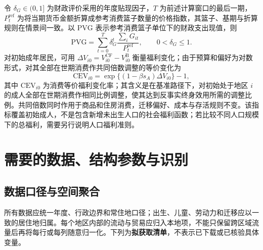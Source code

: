 \documentclass[UTF8,a4paper,zihao=-4,fontset=windows]{ctexart}
\numberwithin{equation}{section}
\newcommand{\B}{\mathrm B}
\newcommand{\CF}{\mathrm{CF}}
\begin{document}
令 $\delta_G\in(0,1]$ 为财政评价采用的年度贴现因子，$T$ 为前述计算窗口的最后一期，$P_t^{\mathrm{ref}}$ 为将当期货币金额折算成参考消费篮子数量的价格指数，其篮子、基期与折算规则在情景间一致。以 $\mathrm{PVG}$ 表示参考消费篮子单位下的财政支出现值，则
\begin{equation}
  \mathrm{PVG}=\sum_{t=0}^{T}\delta_G^t
      \frac{\sum_iG_{it}}{P^{\mathrm{ref}}_t},
  \qquad 0<\delta_G\leq1.
  \label{eq:fiscal-present-value}
\end{equation}
对初始成年居民，可用
$\Delta V_{i0}=V^{\CF}_{i0}-V^\B_{i0}$ 衡量福利变化；由于预算和偏好为对数形式，对其全部在世期消费作共同倍数调整的等价变化为
\begin{equation}
  \mathrm{CEV}_{i0}=\exp\{(1-\beta s_A)\Delta V_{i0}\}-1,
  \label{eq:welfare-cev}
\end{equation}
其中 $\mathrm{CEV}_{i0}$ 为消费等价福利变化率；其含义是在基准路径下，对初始处于地区 $i$ 的成人全部在世期消费作相同比例调整，使其达到反事实终身效用所需的调整比例。共同倍数同时作用于商品和住房消费，迁移偏好、成本与存活规则不变。该指标覆盖初始成人，不是包含新增未出生人口的社会福利函数；若比较不同人口规模下的总福利，需要另行说明人口福利准则。

\section{需要的数据、结构参数与识别}
\label{sec:data-parameters}

\subsection{数据口径与空间聚合}
所有数据应统一年度、行政边界和常住地口径；出生、儿童、劳动力和迁移应以一致的居住地归属。每个地区内部的流动与贸易应归入本地项，不能只保留跨区域流量后再将每行或每列随意归一化。下列为\textbf{拟获取清单}，不表示已下载或已核验具体变量。
\end{document}
